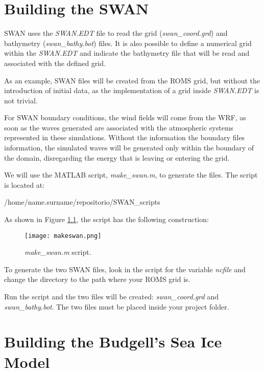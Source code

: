 \bigskip
\chapter{Building the SWAN}

\noindent SWAN uses the \textit{SWAN.EDT} file to read the grid (\textit{swan\_coord.grd}) and bathymetry (\textit{swan\_bathy.bot}) files. 
It is also possible to define a numerical grid within the \textit{SWAN.EDT} and indicate the bathymetry file that will be read and associated 
with the defined grid.
\bigskip

\noindent As an example, SWAN files will be created from the ROMS grid, but without the introduction of initial data,
as the implementation of a grid inside \textit{SWAN.EDT} is not trivial.
\bigskip

\noindent For SWAN boundary conditions, the wind fields will come from the WRF, as soon as
the waves generated are associated with the atmospheric systems represented in these simulations. Without the information
the boundary files information, the simulated waves will be generated only within the boundary of the domain, disregarding the energy that
is leaving or entering the grid.
\bigskip

\noindent We will use the MATLAB script, \textit{make\_swan.m}, to generate the files. The script is located at:
\bigskip

\begin{bashcode}
/home/name.surname/repositorio/SWAN_scripts
\end{bashcode}
\bigskip

\noindent As shown in Figure \textcolor{bleu_cite}{\ref{makeswan}}, the script has the following construction:
\bigskip

\begin{figure}[H]
    \centering
    \texttt{[image: makeswan.png]}
    \caption{\textit{make\_swan.m} script.}
    \label{makeswan}
\end{figure}
\bigskip

\noindent To generate the two SWAN files, look in the script for the variable \textit{ncfile} and change the directory
to the path where your ROMS grid is.
\bigskip

\noindent Run the script and the two files will be created: \textit{swan\_coord.grd} and \textit{swan\_bathy.bot}.
The two files must be placed inside your project folder.
\bigskip

\chapter{Building the Budgell's Sea Ice Model}
\bigskip


